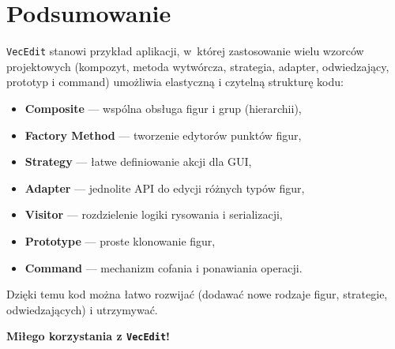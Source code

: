 \documentclass[a4paper,12pt]{article}
\begin{document}
\section{Podsumowanie}
\texttt{VecEdit} stanowi przykład aplikacji, w~której zastosowanie wielu wzorców
projektowych (kompozyt, metoda wytwórcza, strategia, adapter, odwiedzający,
prototyp i command) umożliwia elastyczną i czytelną strukturę kodu:
\begin{itemize}
    \item \textbf{Composite} — wspólna obsługa figur i grup (hierarchii),
    \item \textbf{Factory Method} — tworzenie edytorów punktów figur,
    \item \textbf{Strategy} — łatwe definiowanie akcji dla GUI,
    \item \textbf{Adapter} — jednolite API do edycji różnych typów figur,
    \item \textbf{Visitor} — rozdzielenie logiki rysowania i serializacji,
    \item \textbf{Prototype} — proste klonowanie figur,
    \item \textbf{Command} — mechanizm cofania i ponawiania operacji.
\end{itemize}

Dzięki temu kod można łatwo rozwijać (dodawać nowe rodzaje figur, strategie, odwiedzających) 
i utrzymywać.

\vspace{1em}
\noindent
\textbf{Miłego korzystania z \texttt{VecEdit}!}
\end{document}
